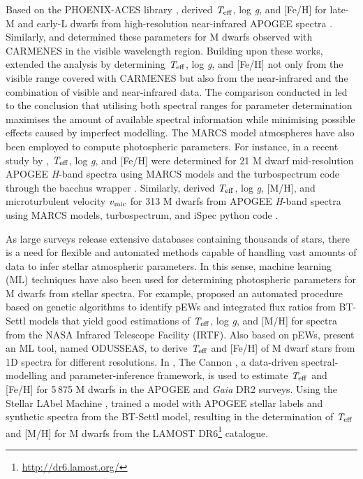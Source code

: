 Based on the PHOENIX-ACES library \citep{Husser2013}, \citet{Birky2017} derived $\textit{T}_{\rm eff}$, log \textit{g}, and [Fe/H] for late-M and early-L dwarfs from high-resolution near-infrared APOGEE spectra \citep{Wilson2010}. Similarly, \citet{pass18} and  \citet[][hereafter Schw19]{schw19} determined these parameters for M dwarfs observed with CARMENES in the visible wavelength region. Building upon these works,   extended the analysis by determining $\textit{T}_{\rm eff}$, log \textit{g}, and [Fe/H]  not only from the visible range covered with CARMENES but also from the near-infrared and the combination of visible and near-infrared data. The comparison conducted in  led to the conclusion that utilising both spectral ranges for parameter determination maximises the amount of available spectral information while minimising possible effects caused by imperfect modelling.
The MARCS model atmospheres \citep{Gustafsson2008} have also been employed to compute photospheric parameters. For instance, in a recent study by \citet{Souto2020}, $\textit{T}_{\rm eff}$, log \textit{g}, and [Fe/H] were determined for 21 M dwarf mid-resolution APOGEE \textit{H}-band spectra using MARCS models and the {\ttfamily turbospectrum} code \citep{Plez2012} through the {\ttfamily bacchus} wrapper \citep{Masseron2016}.
Similarly, \citet{Sarmento2021} derived $\textit{T}_{\rm eff}$, log \textit{g}, [M/H], and microturbulent velocity $v_{\rm mic}$ for 313 M dwarfs from APOGEE \textit{H}-band spectra using MARCS models, {\ttfamily turbospectrum}, and {\ttfamily iSpec} python code \citep{BlancoCuaresma2014}.

As large surveys release extensive databases containing thousands of stars, there is a need for flexible and automated methods capable of handling vast amounts of data to infer stellar atmospheric parameters. In this sense, machine learning (ML) techniques have also been used for determining photospheric parameters for M dwarfs from stellar spectra. For example, \citet{Sarro2018} proposed an automated procedure based on genetic algorithms to identify pEWs and integrated flux ratios from BT-Settl models that yield good estimations of $\textit{T}_{\rm eff}$, log \textit{g}, and [M/H] for spectra from the NASA Infrared Telescope Facility (IRTF). Also based on pEWs, \citet{Antoniadis2020} present an ML tool, named {\ttfamily ODUSSEAS}, to derive $\textit{T}_{\rm eff}$ and [Fe/H] of M dwarf stars from 1D spectra for different resolutions. In \citet{Birky2020}, {\ttfamily The Cannon} \citep{Ness2015,Casey2016}, a data-driven spectral-modelling and parameter-inference framework, is used to estimate $\textit{T}_{\rm eff}$ and [Fe/H] for 5\,875 M dwarfs in the APOGEE \citep{Abolfathi2018} and {\it Gaia} DR2 \citep{GaiaDR2} surveys. Using the Stellar LAbel Machine \citep[SLAM,][]{Zhang2020}, \citet{Li2021} trained a model with APOGEE stellar labels and synthetic spectra from the BT-Settl model, resulting in the determination of $\textit{T}_{\rm eff}$ and [M/H] for M dwarfs from the LAMOST DR6\footnote{\url{http://dr6.lamost.org/}} catalogue.

